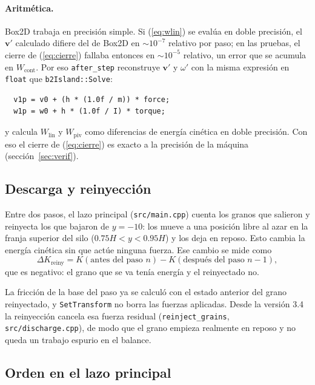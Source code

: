 \documentclass[11pt,a4paper]{article}
\newcommand{\vect}[1]{\mathbf{#1}}
\newcommand{\vv}{\vect{v}}
\newcommand{\code}[1]{\texttt{#1}}
\newcommand{\Wlin}{W_\text{lin}}
\newcommand{\Wpiv}{W_\text{piv}}
\newcommand{\Wcont}{W_\text{cont}}
\newcommand{\dKr}{\Delta K_\text{reiny}}
\begin{document}
\paragraph{Aritmética.} Box2D trabaja en precisión simple. Si
(\ref{eq:wlin}) se evalúa en doble precisión, el $\vv'$ calculado difiere
del de Box2D en $\sim 10^{-7}$ relativo por paso; en las pruebas, el
cierre de (\ref{eq:cierre}) fallaba entonces en $\sim 10^{-5}$ relativo,
un error que se acumula en $\Wcont$. Por eso \code{after\_step} reconstruye $\vv'$ y $\omega'$ con la
misma expresión en \code{float} que \code{b2Island::Solve}:
\begin{verbatim}
  v1p = v0 + (h * (1.0f / m)) * force;
  w1p = w0 + h * (1.0f / I) * torque;
\end{verbatim}
y calcula $\Wlin$ y $\Wpiv$ como diferencias de energía cinética en doble
precisión. Con eso el cierre de (\ref{eq:cierre}) es exacto a la precisión
de la máquina (sección~\ref{sec:verif}).

\subsection{Descarga y reinyección}

Entre dos pasos, el lazo principal (\code{src/main.cpp}) cuenta los granos
que salieron y reinyecta los que bajaron de $y = -10$: los mueve a una
posición libre al azar en la franja superior del silo
($0.75 H < y < 0.95 H$) y los deja en reposo. Esto cambia la energía
cinética sin que actúe ninguna fuerza. Ese cambio se mide como
\[
  \dKr = K(\text{antes del paso } n) - K(\text{después del paso } n-1),
\]
que es negativo: el grano que se va tenía energía y el reinyectado no.

La fricción de la base del paso ya se calculó con el estado anterior del
grano reinyectado, y \code{SetTransform} no borra las fuerzas aplicadas.
Desde la versión 3.4 la reinyección cancela esa fuerza residual
(\code{reinject\_grains}, \code{src/discharge.cpp}), de modo que el grano
empieza realmente en reposo y no queda un trabajo espurio en el balance.

\subsection{Orden en el lazo principal}
\end{document}
